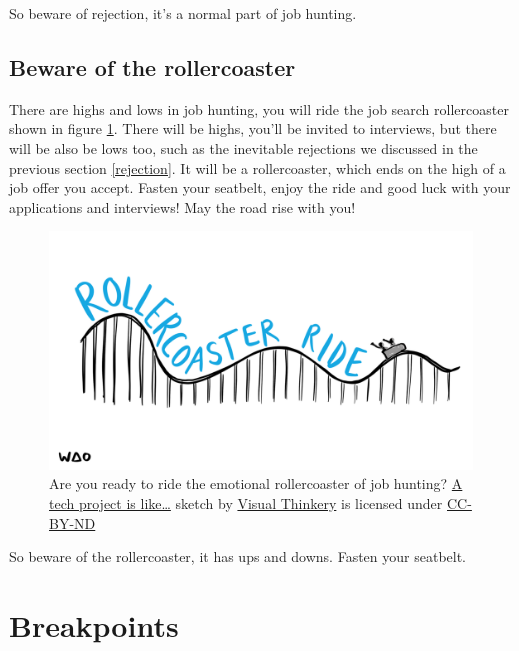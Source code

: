 \documentclass[
]{book}
\begin{document}
So beware of rejection, it's a normal part of job hunting. 🤮

\hypertarget{rollercoaster}{%
\subsection{Beware of the rollercoaster}\label{rollercoaster}}

There are highs and lows in job hunting, you will ride the job search rollercoaster shown in figure \ref{fig:rollercoaster-fig}. There will be highs, you'll be invited to interviews, but there will be also be lows too, such as the inevitable rejections we discussed in the previous section \ref{rejection}. It will be a rollercoaster, which ends on the high of a job offer you accept. Fasten your seatbelt, enjoy the ride and good luck with your applications and interviews! May the road rise with you! \citep{rise}

\begin{figure}

{\centering \includegraphics[width=0.98\linewidth]{images/Rollercoaster-ride} 

}

\caption{Are you ready to ride the emotional rollercoaster of job hunting? \href{https://bryanmmathers.com/rollercoaster-ride}{A tech project is like\ldots{}} sketch by \href{https://visualthinkery.com/}{Visual Thinkery} is licensed under \href{https://creativecommons.org/licenses/by-nd/4.0/}{CC-BY-ND}}\label{fig:rollercoaster-fig}
\end{figure}



So beware of the rollercoaster, it has ups and downs. Fasten your seatbelt. 🎢

\hypertarget{bp8}{%
\section{Breakpoints}\label{bp8}}
\end{document}
